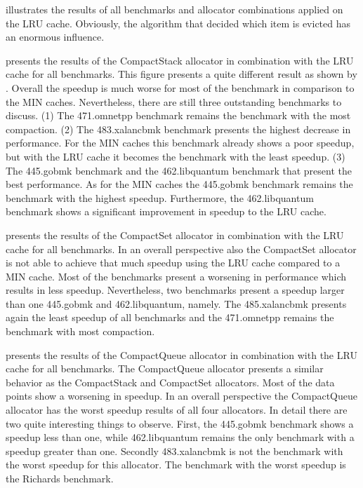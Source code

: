 \documentclass[onecolumn, openright, master, english, signatures]{dbrgrptt}
\begin{document}
 illustrates the results of all benchmarks and allocator combinations applied on the \ac{LRU} cache.
Obviously, the algorithm that decided which item is evicted has an enormous influence.

 presents the results of the CompactStack allocator in combination with the \ac{LRU} cache for all benchmarks.
This figure presents a quite different result as shown by .
Overall the speedup is much worse for most of the benchmark in comparison to the \ac{MIN} caches.
Nevertheless, there are still three outstanding benchmarks to discuss.
(1) The 471.omnetpp benchmark remains the benchmark with the most compaction.
(2) The 483.xalancbmk benchmark presents the highest decrease in performance.
For the \ac{MIN} caches this benchmark already shows a poor speedup, but with the \ac{LRU} cache it becomes the benchmark with the least speedup.
(3) The 445.gobmk benchmark and the 462.libquantum benchmark that present the best performance.
As for the \ac{MIN} caches the 445.gobmk benchmark remains the benchmark with the highest speedup.
Furthermore, the 462.libquantum benchmark shows a significant improvement in speedup to the \ac{LRU} cache.

 presents the results of the CompactSet allocator in combination with the \ac{LRU} cache for all benchmarks.
In an overall perspective also the CompactSet allocator is not able to achieve that much speedup using the \ac{LRU} cache compared to a \ac{MIN} cache.
Most of the benchmarks present a worsening in performance which results in less speedup.
Nevertheless, two benchmarks present a speedup larger than one 445.gobmk and 462.libquantum, namely.
The 485.xalancbmk presents again the least speedup of all benchmarks and the 471.omnetpp remains the benchmark with most compaction.

 presents the results of the CompactQueue allocator in combination with the \ac{LRU} cache for all benchmarks.
The CompactQueue allocator presents a similar behavior as the CompactStack and CompactSet allocators.
Most of the data points show a worsening in speedup.
In an overall perspective the CompactQueue allocator has the worst speedup results of all four allocators.
In detail there are two quite interesting things to observe.
First, the 445.gobmk benchmark shows a speedup less than one, while 462.libquantum remains the only benchmark with a speedup greater than one.
Secondly 483.xalancbmk is not the benchmark with the worst speedup for this allocator.
The benchmark with the worst speedup is the Richards benchmark.
\end{document}
